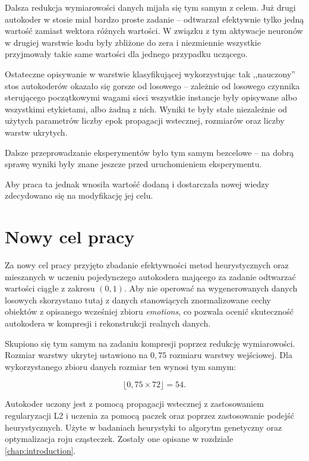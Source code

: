 \documentclass[11pt,a4paper,oneside]{report}
\begin{document}
Dalsza redukcja wymiarowości danych mijała się tym samym z celem. Już drugi autokoder w stosie miał bardzo proste zadanie -- odtwarzał efektywnie tylko jedną wartość zamiast wektora różnych wartości. W związku z tym aktywacje neuronów w drugiej warstwie kodu były zbliżone do zera i niezmiennie wszystkie przyjmowały takie same wartości dla jednego przypadku uczącego. 

Ostateczne opisywanie w warstwie klasyfikującej wykorzystując tak ,,nauczony'' stos autokoderów okazało się gorsze od losowego -- zależnie od losowego czynnika sterującego początkowymi wagami sieci wszystkie instancje były opisywane albo wszystkimi etykietami, albo żadną z nich. Wyniki te były stałe niezależnie od użytych parametrów liczby epok propagacji wstecznej, rozmiarów oraz liczby warstw ukrytych. 

Dalsze przeprowadzanie eksperymentów było tym samym bezcelowe -- na dobrą sprawę wyniki były znane jeszcze przed uruchomieniem eksperymentu.

Aby praca ta jednak wnosiła wartość dodaną i dostarczała nowej wiedzy zdecydowano się na modyfikację jej celu.


\section{Nowy cel pracy}

Za nowy cel pracy przyjęto zbadanie efektywności metod heurystycznych oraz mieszanych w uczeniu pojedynczego autokodera mającego za zadanie odtwarzać wartości ciągłe z zakresu $(0, 1)$. Aby nie operować na wygenerowanych danych losowych skorzystano tutaj z danych stanowiących znormalizowane cechy obiektów z opisanego wcześniej zbioru \textit{emotions}, co pozwala ocenić skuteczność autokodera w kompresji i rekonstrukcji realnych danych. 

Skupiono się tym samym na zadaniu kompresji poprzez redukcję wymiarowości. Rozmiar warstwy ukrytej ustawiono na $0,75$ rozmiaru warstwy wejściowej. Dla wykorzystanego zbioru danych rozmiar ten wynosi tym samym:

\begin{equation}
\lfloor 0,75 \times 72 \rfloor = 54 .
\end{equation}

Autokoder uczony jest z pomocą propagacji wstecznej z zastosowaniem regularyzacji L2 i uczenia za pomocą paczek oraz poprzez zastosowanie podejść heurystycznych. Użyte w badaniach heurystyki to algorytm genetyczny oraz optymalizacja roju cząsteczek. Zostały one opisane w rozdziale \ref{chap:introduction}. 
\end{document}
